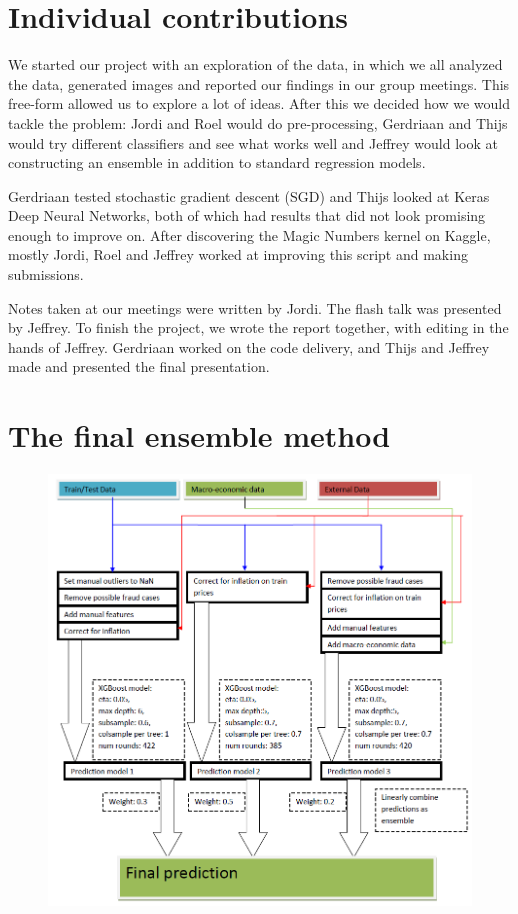 \documentclass[a4paper,11pt,twocolumn]{article}
\begin{document}
\onecolumn
\section{Individual contributions}
We started our project with an exploration of the data, in which we all analyzed
the data, generated images and reported our findings in our group meetings. This
free-form allowed us to explore a lot of ideas. After this we decided how we
would tackle the problem: Jordi and Roel would do pre-processing, Gerdriaan and
Thijs would try different classifiers and see what works well and Jeffrey would
look at constructing an ensemble in addition to standard regression models.

Gerdriaan tested stochastic gradient descent (SGD) and Thijs looked at Keras
Deep Neural Networks, both of which had results that did not look promising
enough to improve on. After discovering the Magic Numbers kernel on Kaggle,
mostly Jordi, Roel and Jeffrey worked at improving this script and making
submissions.

Notes taken at our meetings were written by Jordi. The flash talk was presented
by Jeffrey. To finish the project, we wrote the report together, with editing in
the hands of Jeffrey. Gerdriaan worked on the code delivery, and Thijs and
Jeffrey made and presented the final presentation.

\clearpage

\appendix
\section{The final ensemble method}
\label{app:final}

\begin{figure}[H]
\centering
\includegraphics[width=\textwidth]{ensemble.png}
\label{fig:ens}
\end{figure}
\end{document}
